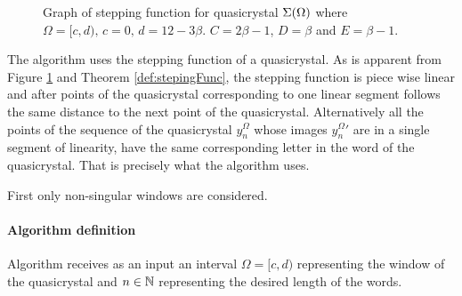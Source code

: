 \documentclass[text.tex]{subfiles}
\begin{document}
\begin{figure}[h]
\centering
\caption{Graph of stepping function for quasicrystal $\Sigma(\Omega)$ where $\Omega = [c,d),\, c=0,\, d=12-3\beta$. $C= 2\beta-1$, $D= \beta$ and $E= \beta-1$.}
\label{img:steppingFunction}
\end{figure}

The algorithm uses the stepping function of a quasicrystal. As is apparent from Figure \ref{img:steppingFunction} and Theorem \ref{def:stepingFunc}, the stepping function is piece wise linear and after points of the quasicrystal corresponding to one linear segment follows the same distance to the next point of the quasicrystal. Alternatively all the points of the sequence of the quasicrystal $y_n^\Omega$ whose images ${y_n^\Omega}'$ are in a single segment of linearity, have the same corresponding letter in the word of the quasicrystal. That is precisely what the algorithm uses. 

First only non-singular windows are considered.

\paragraph{Algorithm definition}
Algorithm receives as an input an interval $\Omega = [c,d)$ representing the window of the quasicrystal and $n\in\mathbb{N}$ representing the desired length of the words.
\end{document}
